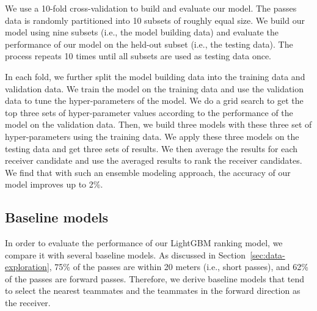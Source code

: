 We use a 10-fold cross-validation to build and evaluate our model. 
The passes data is randomly partitioned into 10 subsets of roughly equal size. 
We build our model using nine subsets (i.e., the model building data) and evaluate the performance of our model on the held-out subset (i.e., the testing data).
The process repeats 10 times until all subsets are used as testing data once.

In each fold, we further split the model building data into the training data and validation data.
We train the model on the training data and use the validation data to tune the hyper-parameters of the model. %
We do a grid search to get the top three sets of hyper-parameter values according to the performance of the model on the validation data.
Then, we build three models with these three set of hyper-parameters using the training data. 
We apply these three models on the testing data and get three sets of results.
We then average the results for each receiver candidate and use the averaged results to rank the receiver candidates. We find that with such an ensemble modeling approach, the accuracy of our model improves up to 2\%.%


\subsection{Baseline models}\label{baseline-models}

In order to evaluate the performance of our LightGBM ranking model, we compare it with several baseline models.
As discussed in Section~\ref{sec:data-exploration}, 75\% of the passes are within 20 meters (i.e., short passes), and 62\% of the passes are forward passes.
Therefore, we derive baseline models that tend to select the nearest teammates and the teammates in the forward direction as the receiver.

